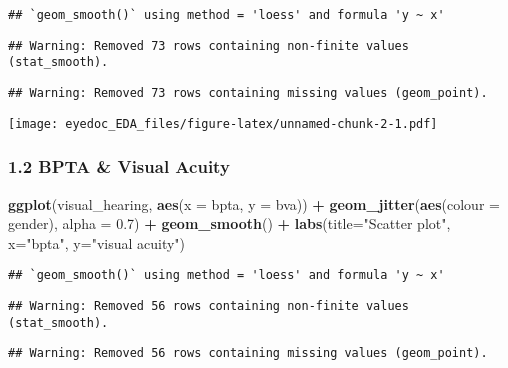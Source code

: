 \documentclass[]{article}
\newenvironment{Shaded}{\begin{snugshade}}{\end{snugshade}}
\newcommand{\DataTypeTok}[1]{\textcolor[rgb]{0.13,0.29,0.53}{#1}}
\newcommand{\FloatTok}[1]{\textcolor[rgb]{0.00,0.00,0.81}{#1}}
\newcommand{\KeywordTok}[1]{\textcolor[rgb]{0.13,0.29,0.53}{\textbf{#1}}}
\newcommand{\NormalTok}[1]{#1}
\newcommand{\OperatorTok}[1]{\textcolor[rgb]{0.81,0.36,0.00}{\textbf{#1}}}
\newcommand{\StringTok}[1]{\textcolor[rgb]{0.31,0.60,0.02}{#1}}
\begin{document}
\begin{verbatim}
## `geom_smooth()` using method = 'loess' and formula 'y ~ x'
\end{verbatim}

\begin{verbatim}
## Warning: Removed 73 rows containing non-finite values (stat_smooth).
\end{verbatim}

\begin{verbatim}
## Warning: Removed 73 rows containing missing values (geom_point).
\end{verbatim}

\texttt{[image: eyedoc\_EDA\_files/figure-latex/unnamed-chunk-2-1.pdf]}

\hypertarget{bpta-visual-acuity}{%
\subsubsection{1.2 BPTA \& Visual Acuity}\label{bpta-visual-acuity}}

\begin{Shaded}
\begin{Highlighting}[]
\KeywordTok{ggplot}\NormalTok{(visual_hearing, }\KeywordTok{aes}\NormalTok{(}\DataTypeTok{x =}\NormalTok{ bpta, }\DataTypeTok{y =}\NormalTok{ bva)) }\OperatorTok{+}
\StringTok{    }\KeywordTok{geom_jitter}\NormalTok{(}\KeywordTok{aes}\NormalTok{(}\DataTypeTok{colour =}\NormalTok{ gender), }\DataTypeTok{alpha =} \FloatTok{0.7}\NormalTok{) }\OperatorTok{+}
\StringTok{    }\KeywordTok{geom_smooth}\NormalTok{() }\OperatorTok{+}
\StringTok{    }\KeywordTok{labs}\NormalTok{(}\DataTypeTok{title=}\StringTok{"Scatter plot"}\NormalTok{, }\DataTypeTok{x=}\StringTok{"bpta"}\NormalTok{, }\DataTypeTok{y=}\StringTok{"visual acuity"}\NormalTok{)}
\end{Highlighting}
\end{Shaded}

\begin{verbatim}
## `geom_smooth()` using method = 'loess' and formula 'y ~ x'
\end{verbatim}

\begin{verbatim}
## Warning: Removed 56 rows containing non-finite values (stat_smooth).
\end{verbatim}

\begin{verbatim}
## Warning: Removed 56 rows containing missing values (geom_point).
\end{verbatim}
\end{document}
